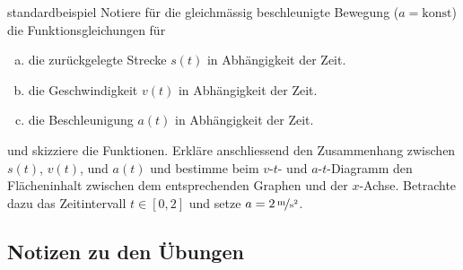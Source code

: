 \documentclass[%
<<<<<<< Updated upstream
11pt,%
twoside,%
titlepage,%
german,%
headsepline%
]{scrartcl}
\begin{document}
\begin{uebenv}{standardbeispiel}
Notiere für die gleichmässig beschleunigte Bewegung ($a=\text{konst}$) die Funk\-tions\-glei\-chungen für
\begin{enumerate}[a)]
\item die zurückgelegte Strecke $s(t)$ in Abhängigkeit der Zeit.
\item die Geschwindigkeit $v(t)$ in Abhängigkeit der Zeit.
\item die Beschleunigung $a(t)$ in Abhängigkeit der Zeit.
\end{enumerate}
und skizziere die Funktionen. Erkläre anschliessend den Zusammenhang zwischen $s(t)$, $v(t)$, und $a(t)$ und bestimme beim $v$-$t$- und $a$-$t$-Diagramm den Flächeninhalt zwischen dem entsprechenden Graphen und der $x$-Achse. Betrachte dazu das Zeitintervall $t\in [0,2]$ und setze $a=\unitfrac[2]{m}{s^2}$.
\end{uebenv}

\clearpage

\subsection{Notizen zu den Übungen}
\end{document}
